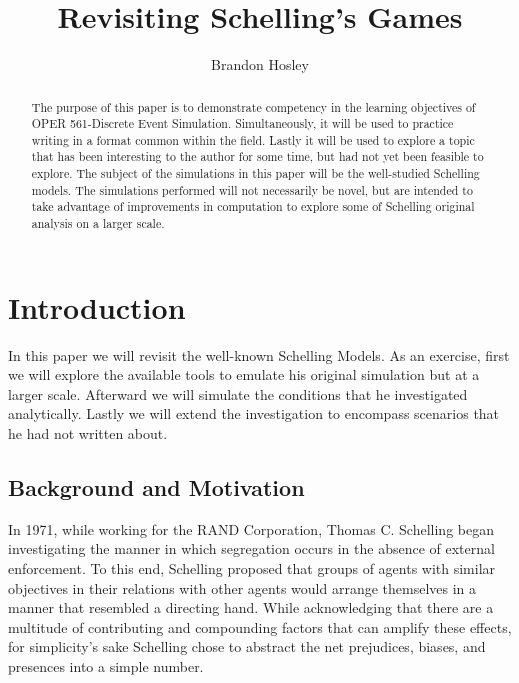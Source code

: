 \documentclass[sigplan,nonacm]{acmart}
\begin{document}
\title{Revisiting Schelling's Games}

\author{Brandon Hosley}


\begin{abstract}
	The purpose of this paper is to demonstrate competency in the learning 
	objectives of OPER 561-Discrete Event Simulation.
	Simultaneously, it will be used to practice writing in a format
	common within the field.
	Lastly it will be used to explore a topic that has been interesting
	to the author for some time, but had not yet been feasible to explore.
	The subject of the simulations in this paper will be the well-studied
	Schelling models. The simulations performed will not necessarily be
	novel, but are intended to take advantage of improvements in computation
	to explore some of Schelling original analysis on a larger scale.
\end{abstract}



\maketitle

\section{Introduction}

In this paper we will revisit the well-known Schelling Models\cite{Schelling1971}.
As an exercise, first we will explore the available tools to emulate his original
simulation but at a larger scale.
Afterward we will simulate the conditions that he investigated analytically.
Lastly we will extend the investigation to encompass scenarios that he had not
written about.

\subsection{Background and Motivation}

In 1971, while working for the RAND Corporation, Thomas C. Schelling began investigating
the manner in which segregation occurs in the absence of external enforcement.
To this end, Schelling proposed that groups of agents with similar objectives in their relations
with other agents would arrange themselves in a manner that resembled a directing hand.
While acknowledging that there are a multitude of contributing and compounding factors that can amplify these effects, 
for simplicity's sake Schelling chose to abstract the net prejudices, biases, and presences into a simple number.
\end{document}

